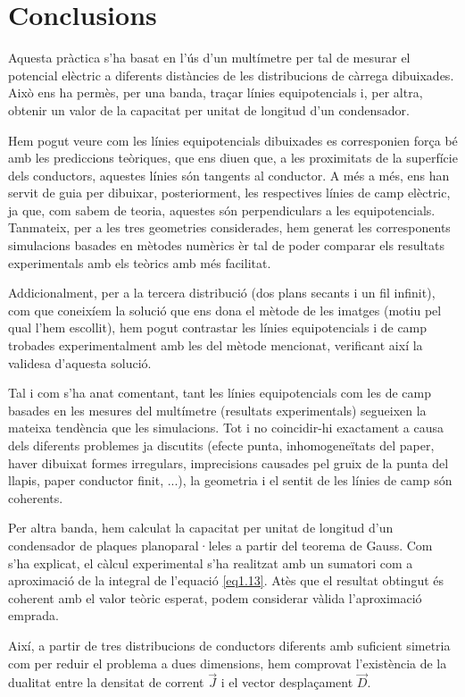 \documentclass[a4paper,10.5pt]{report}
\begin{document}
\section{Conclusions}
Aquesta pràctica s'ha basat en l'ús d'un multímetre per tal de mesurar el potencial elèctric a diferents distàncies de les distribucions de càrrega dibuixades. Això ens ha permès, per una banda, traçar línies equipotencials i, per altra, obtenir un valor de la capacitat per unitat de longitud d'un condensador.

Hem pogut veure com les línies equipotencials dibuixades es corresponien força bé amb les prediccions teòriques, que ens diuen que, a les proximitats de la superfície dels conductors, aquestes línies són tangents al conductor. A més a més, ens han servit de guia per dibuixar, posteriorment, les respectives línies de camp elèctric, ja que, com sabem de teoria, aquestes són perpendiculars a les equipotencials. Tanmateix, per a les tres geometries considerades, hem generat les corresponents simulacions basades en mètodes numèrics èr tal de poder comparar els resultats experimentals amb els teòrics amb més facilitat.

Addicionalment, per a la tercera distribució (dos plans secants i un fil infinit), com que coneixíem la solució que ens dona el mètode de les imatges (motiu pel qual l'hem escollit), hem pogut contrastar les línies equipotencials i de camp trobades experimentalment amb les del mètode mencionat, verificant així la validesa d'aquesta solució.

Tal i com s'ha anat comentant, tant les línies equipotencials com les de camp basades en les mesures del multímetre (resultats experimentals) segueixen la mateixa tendència que les simulacions. Tot i no coincidir-hi exactament a causa dels diferents problemes ja discutits (efecte punta, inhomogeneïtats del paper, haver dibuixat formes irregulars, imprecisions causades pel gruix de la punta del llapis, paper conductor finit, ...), la geometria i el sentit de les línies de camp són coherents.

Per altra banda, hem calculat la capacitat per unitat de longitud d'un condensador de plaques planoparal·leles a partir del teorema de Gauss. Com s'ha explicat, el càlcul experimental s'ha realitzat amb un sumatori com a aproximació de la integral de l'equació \ref{eq1.13}. Atès que el resultat obtingut és coherent amb el valor teòric esperat, podem considerar vàlida l'aproximació emprada.

Així, a partir de tres distribucions de conductors diferents amb suficient simetria com per reduir el problema a dues dimensions, hem comprovat l'existència de la dualitat entre la densitat de corrent $\vec{J}$ i el vector desplaçament $\vec{D}$.
\end{document}
